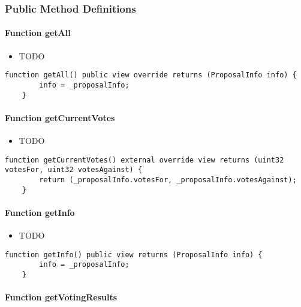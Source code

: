 \subsubsection{Public Method Definitions}


\paragraph{Function getAll}

\begin{itemize}
\item TODO
\end{itemize}

\begin{lstlisting}[firstnumber=168]
    function getAll() public view override returns (ProposalInfo info) {
        info = _proposalInfo;
    }
\end{lstlisting}

\paragraph{Function getCurrentVotes}

\begin{itemize}
\item TODO
\end{itemize}

\begin{lstlisting}[firstnumber=181]
    function getCurrentVotes() external override view returns (uint32 votesFor, uint32 votesAgainst) {
        return (_proposalInfo.votesFor, _proposalInfo.votesAgainst);
    }
\end{lstlisting}

\paragraph{Function getInfo}

\begin{itemize}
\item TODO
\end{itemize}

\begin{lstlisting}[firstnumber=177]
    function getInfo() public view returns (ProposalInfo info) {
        info = _proposalInfo;
    }
\end{lstlisting}

\paragraph{Function getVotingResults}

